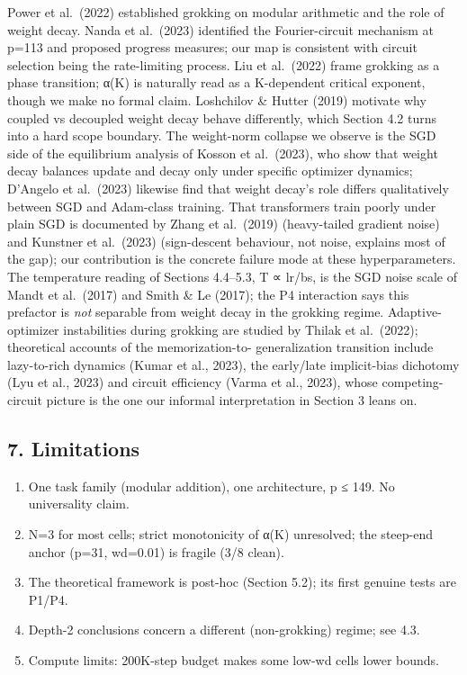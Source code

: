 \documentclass[
  11pt,
]{article}
\providecommand{\tightlist}{%
  \setlength{\itemsep}{0pt}\setlength{\parskip}{0pt}}
\begin{document}
Power et al.~(2022) established grokking on modular arithmetic and the
role of weight decay. Nanda et al.~(2023) identified the Fourier-circuit
mechanism at p=113 and proposed progress measures; our map is consistent
with circuit selection being the rate-limiting process. Liu et
al.~(2022) frame grokking as a phase transition; α(K) is naturally read
as a K-dependent critical exponent, though we make no formal claim.
Loshchilov \& Hutter (2019) motivate why coupled vs decoupled weight
decay behave differently, which Section 4.2 turns into a hard scope
boundary. The weight-norm collapse we observe is the SGD side of the
equilibrium analysis of Kosson et al.~(2023), who show that weight decay
balances update and decay only under specific optimizer dynamics;
D'Angelo et al.~(2023) likewise find that weight decay's role differs
qualitatively between SGD and Adam-class training. That transformers
train poorly under plain SGD is documented by Zhang et al.~(2019)
(heavy-tailed gradient noise) and Kunstner et al.~(2023) (sign-descent
behaviour, not noise, explains most of the gap); our contribution is the
concrete failure mode at these hyperparameters. The temperature reading
of Sections 4.4--5.3, T ∝ lr/bs, is the SGD noise scale of Mandt et
al.~(2017) and Smith \& Le (2017); the P4 interaction says this
prefactor is \emph{not} separable from weight decay in the grokking
regime. Adaptive-optimizer instabilities during grokking are studied by
Thilak et al.~(2022); theoretical accounts of the memorization-to-
generalization transition include lazy-to-rich dynamics (Kumar et al.,
2023), the early/late implicit-bias dichotomy (Lyu et al., 2023) and
circuit efficiency (Varma et al., 2023), whose competing-circuit picture
is the one our informal interpretation in Section 3 leans on.

\subsection{7. Limitations}\label{limitations}

\begin{enumerate}
\def\labelenumi{\arabic{enumi}.}
\tightlist
\item
  One task family (modular addition), one architecture, p ≤ 149. No
  universality claim.
\item
  N=3 for most cells; strict monotonicity of α(K) unresolved; the
  steep-end anchor (p=31, wd=0.01) is fragile (3/8 clean).
\item
  The theoretical framework is post-hoc (Section 5.2); its first genuine
  tests are P1/P4.
\item
  Depth-2 conclusions concern a different (non-grokking) regime; see
  4.3.
\item
  Compute limits: 200K-step budget makes some low-wd cells lower bounds.
\end{enumerate}
\end{document}

